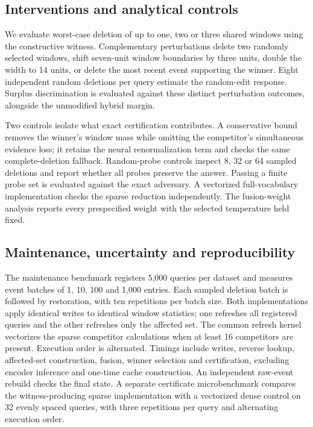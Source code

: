 \subsection{Interventions and analytical controls}
We evaluate worst-case deletion of up to one, two or three shared windows using the constructive witness. Complementary perturbations delete two randomly selected windows, shift seven-unit window boundaries by three units, double the width to 14 units, or delete the most recent event supporting the winner. Eight independent random deletions per query estimate the random-edit response. Surplus discrimination is evaluated against these distinct perturbation outcomes, alongside the unmodified hybrid margin.

Two controls isolate what exact certification contributes. A conservative bound removes the winner's window mass while omitting the competitor's simultaneous evidence loss; it retains the neural renormalization term and checks the same complete-deletion fallback. Random-probe controls inspect 8, 32 or 64 sampled deletions and report whether all probes preserve the answer. Passing a finite probe set is evaluated against the exact adversary. A vectorized full-vocabulary implementation checks the sparse reduction independently. The fusion-weight analysis reports every prespecified weight with the selected temperature held fixed.

\subsection{Maintenance, uncertainty and reproducibility}
The maintenance benchmark registers 5,000 queries per dataset and measures event batches of 1, 10, 100 and 1,000 entries. Each sampled deletion batch is followed by restoration, with ten repetitions per batch size. Both implementations apply identical writes to identical window statistics; one refreshes all registered queries and the other refreshes only the affected set. The common refresh kernel vectorizes the sparse competitor calculations when at least 16 competitors are present. Execution order is alternated. Timings include writes, reverse lookup, affected-set construction, fusion, winner selection and certification, excluding encoder inference and one-time cache construction. An independent raw-event rebuild checks the final state. A separate certificate microbenchmark compares the witness-producing sparse implementation with a vectorized dense control on 32 evenly spaced queries, with three repetitions per query and alternating execution order.

